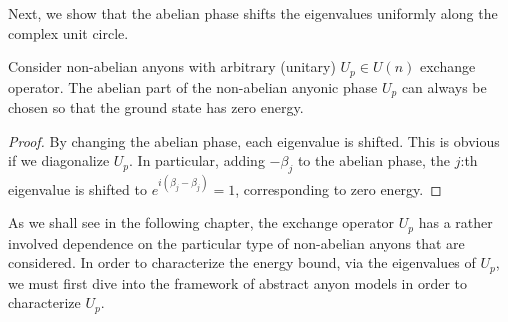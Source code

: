 Next, we show that the abelian phase shifts the eigenvalues uniformly along the complex unit circle.

\begin{proposition}
  Consider non-abelian anyons with arbitrary (unitary) $U_p \in U(n)$ exchange operator. The abelian part of the non-abelian anyonic phase $U_p$ can always be chosen so that the ground state has zero energy.
\end{proposition}

\begin{proof}
  By changing the abelian phase, each eigenvalue is shifted. This is obvious if we diagonalize $U_p$. In particular, adding $-\beta_j$ to the abelian phase, the $j$:th eigenvalue is shifted to $e^{i(\beta_j-\beta_j)} = 1$, corresponding to zero energy.
\end{proof}



As we shall see in the following chapter, the exchange operator $U_p$ has a rather involved dependence on the particular type of non-abelian anyons that are considered. In order to characterize the energy bound, via the eigenvalues of $U_p$, we must first dive into the framework of abstract anyon models in order to characterize $U_p$.
